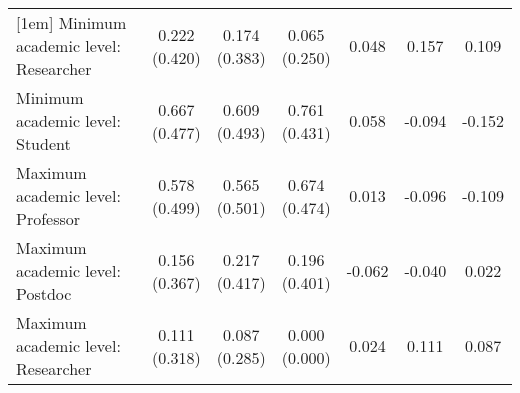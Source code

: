 \begin{table}[ht]
{\begin{tabular}{lcccccc}
[1em]
Minimum academic level: Researcher & \shortstack{0.222\\(0.420)} & \shortstack{0.174\\(0.383)} & \shortstack{0.065\\(0.250)} & \shortstack{0.048\\\relax[0.568]} & \shortstack{0.157\\\relax[0.033]} & \shortstack{0.109\\\relax[0.110]}\\
[1em]
Minimum academic level: Student & \shortstack{0.667\\(0.477)} & \shortstack{0.609\\(0.493)} & \shortstack{0.761\\(0.431)} & \shortstack{0.058\\\relax[0.570]} & \shortstack{-0.094\\\relax[0.325]} & \shortstack{-0.152\\\relax[0.119]}\\
[1em]
Maximum academic level: Professor & \shortstack{0.578\\(0.499)} & \shortstack{0.565\\(0.501)} & \shortstack{0.674\\(0.474)} & \shortstack{0.013\\\relax[0.905]} & \shortstack{-0.096\\\relax[0.349]} & \shortstack{-0.109\\\relax[0.288]}\\
[1em]
Maximum academic level: Postdoc & \shortstack{0.156\\(0.367)} & \shortstack{0.217\\(0.417)} & \shortstack{0.196\\(0.401)} & \shortstack{-0.062\\\relax[0.455]} & \shortstack{-0.040\\\relax[0.620]} & \shortstack{0.022\\\relax[0.799]}\\
[1em]
Maximum academic level: Researcher & \shortstack{0.111\\(0.318)} & \shortstack{0.087\\(0.285)} & \shortstack{0.000\\(0.000)} & \shortstack{0.024\\\relax[0.703]} & \shortstack{0.111\\\relax[0.020]} & \shortstack{0.087\\\relax[0.041]}\\

\end{tabular}}
\end{table}
